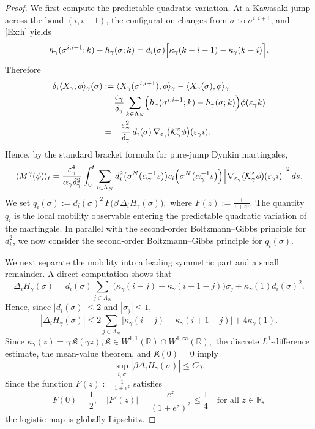 \documentclass{article}
\begin{document}
\begin{proof}
We first compute the predictable quadratic variation. 
At a Kawasaki jump across the bond
\((i,i+1)\), the configuration changes from \(\sigma\) to \(\sigma^{i,i+1}\), and
\eqref{Ex:h} yields
\[
h_\gamma(\sigma^{i,i+1};k)-h_\gamma(\sigma;k)
=
d_i(\sigma)\Bigl[\kappa_\gamma(k-i-1)-\kappa_\gamma(k-i)\Bigr].
\]
Therefore
\begin{align*}
\delta_{i}\langle X_\gamma,\phi\rangle_\gamma(\sigma)
&:=
\langle X_\gamma(\sigma^{i,i+1}),\phi\rangle_\gamma
-
\langle X_\gamma(\sigma),\phi\rangle_\gamma \\
&=
\frac{\varepsilon_\gamma}{\delta_\gamma}
\sum_{k\in\Lambda_N}
\Bigl(h_\gamma(\sigma^{i,i+1};k)-h_\gamma(\sigma;k)\Bigr)\phi(\varepsilon_\gamma k) \\
&=
-\frac{\varepsilon_\gamma^2}{\delta_\gamma}\,
d_i(\sigma)\,
\nabla_{\varepsilon_\gamma}\!\bigl(\mathcal K_\gamma^\varepsilon\phi\bigr)
(\varepsilon_\gamma i).
\end{align*}
Hence, by the standard bracket formula for pure-jump Dynkin martingales,
\begin{equation}\label{eq:qv-exact}
\langle M^\gamma(\phi)\rangle_t =  \frac{\varepsilon_\gamma^4}{\alpha_\gamma\delta_\gamma^2}
\int_0^t \sum_{i \in\Lambda_N} d^2_i\big( \sigma^N(\alpha_{\gamma}^{-1}s) \big)c_i\Big(\sigma^N\big( \alpha_{\gamma}^{-1}s \big)\Big)
\Bigl[
\nabla_{\varepsilon_\gamma}(\mathcal K_\gamma^\varepsilon\phi)(\varepsilon_\gamma i)
\Bigr]^2
\,ds.
\end{equation}
We set
\(
q_i(\sigma):=d_i(\sigma)^2\,F\!\bigl(\beta\,\Delta_iH_\gamma(\sigma)\bigr),
\)
where $F(z):=\frac{1}{1+e^z}$.
The quantity \(q_i\) is the local mobility observable entering the predictable quadratic variation of the martingale.
In parallel with the second-order Boltzmann–Gibbs principle for $d^2_i$, we now consider the second-order Boltzmann–Gibbs principle for \(
q_i(\sigma).
\)

We next separate the mobility into a leading symmetric part and a small remainder.
A direct computation shows that
\[
\Delta_i H_\gamma(\sigma)
=
d_i(\sigma)\sum_{j\in\Lambda_N}
\bigl(\kappa_\gamma(i-j)-\kappa_\gamma(i+1-j)\bigr)\sigma_j
+\kappa_\gamma(1)d_i(\sigma)^2.
\]
Hence, since \(|d_i(\sigma)|\le 2\) and \(|\sigma_j|\le1\),
\[
|\Delta_i H_\gamma(\sigma)|
\le
2\sum_{j\in\Lambda_N}
\bigl|\kappa_\gamma(i-j)-\kappa_\gamma(i+1-j)\bigr|
+4\kappa_\gamma(1).
\]
Since
\(
\kappa_\gamma(z)=\gamma\,\mathfrak K(\gamma z),
\mathfrak K\in W^{1,1}(\mathbb R)\cap W^{1,\infty}(\mathbb R),
\)
the discrete \(L^1\)-difference estimate, the mean-value theorem, and
\(\mathfrak K(0)=0\) imply
\[
\sup_{i,\sigma}|\beta\Delta_i H_\gamma(\sigma)|\le C\gamma.
\]
Since the function $F(z):=\frac{1}{1+e^{z}}$ satisfies
\[
F(0)=\frac12, \quad
|F'(z)|=\frac{e^{z}}{(1+e^{z})^2}\le \frac{1}{4}
\quad\text{for all }z\in\mathbb R,
\]
the logistic map is globally Lipschitz. 


\end{proof}
\end{document}
